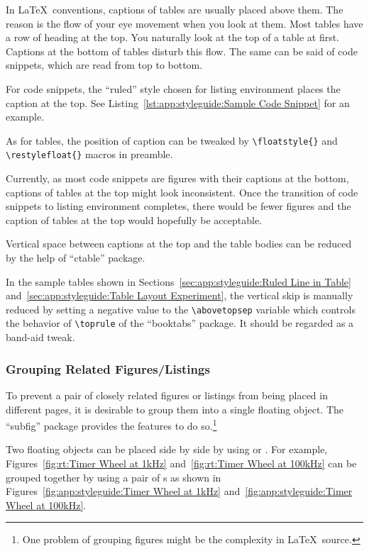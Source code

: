 In \LaTeX\ conventions, captions of tables are usually placed
above them. The reason is the flow of your eye movement
when you look at them. Most tables have a row of heading at the
top. You naturally look at the top of a table at first. Captions at
the bottom of tables disturb this flow.
The same can be said of code snippets, which are read from
top to bottom.

For code snippets, the ``ruled'' style chosen for listing
environment places the caption at the top.
See Listing~\ref{lst:app:styleguide:Sample Code Snippet}
for an example.

As for tables, the position of caption can be tweaked by
\verb|\floatstyle{}| and \verb|\restylefloat{}| macros
in preamble.

Currently, as most code snippets are figures with their captions
at the bottom, captions of tables at the top might look inconsistent.
Once the transition of code snippets to listing environment
completes, there would be fewer figures and the caption of tables
at the top would hopefully be acceptable.

Vertical space between captions at the top and the table bodies
can be reduced by the help of ``ctable'' package.

In the sample tables shown in
Sections~\ref{sec:app:styleguide:Ruled Line in Table}
and~\ref{sec:app:styleguide:Table Layout Experiment},
the vertical skip is manually reduced by setting a negative value to the
\verb|\abovetopsep| variable which controls the behavior of
\verb|\toprule| of the ``booktabs'' package.
It should be regarded as a band-aid tweak.

\subsubsection{Grouping Related Figures/Listings}
\label{sec:app:styleguide:Grouping Related Figures/Listings}

To prevent a pair of closely related figures or listings
from being placed in different pages, it is desirable to group
them into a single floating object.
The ``subfig'' package provides the features to do so.\footnote{
  One problem of grouping figures might be the complexity in
  \LaTeX\ source.}

Two floating objects can be placed side by side by using
\co{\\parbox} or .
For example,
Figures~\ref{fig:rt:Timer Wheel at 1kHz}
and~\ref{fig:rt:Timer Wheel at 100kHz}
can be grouped together by using a pair of s
as shown in
Figures~\ref{fig:app:styleguide:Timer Wheel at 1kHz}
and~\ref{fig:app:styleguide:Timer Wheel at 100kHz}.

